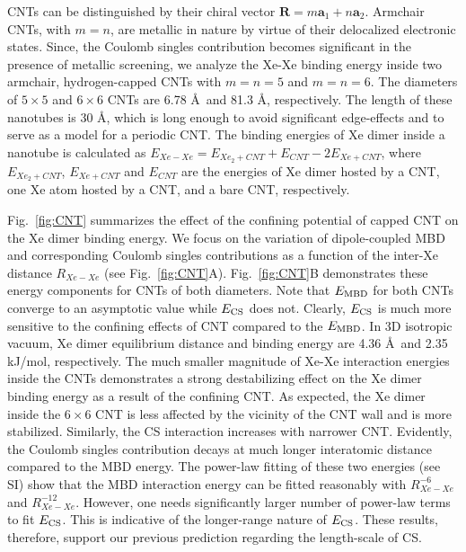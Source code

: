 \documentclass[aps,prl,groupaddress, twocolumn]{revtex4-1}  %
\begin{document}
CNTs can be distinguished by their chiral vector $\mathbf{R}=m \mathbf{a}_1 +n \mathbf{a}_2 $.
Armchair CNTs, with $m=n$, are metallic in nature by virtue of their delocalized electronic states. Since, the Coulomb singles contribution becomes significant in the presence of metallic screening\cite{sadhukhan_prl_2017}, we analyze the Xe-Xe binding energy inside two armchair, hydrogen-capped CNTs with $m = n = 5$ and $m = n = 6$. The diameters of $5\times5$ and $6\times6$ CNTs are 6.78 \AA\ and 81.3 \AA, respectively. The length of these nanotubes is 30 \AA, which is long enough to avoid significant edge-effects and to serve as a model for a periodic CNT\@. The binding energies of Xe dimer inside a nanotube is calculated as $E_{Xe-Xe} = E_{Xe_2+CNT}+E_{CNT} - 2 E_{Xe+CNT}$, where $E_{Xe_2+CNT}$, $E_{Xe+CNT}$ and $E_{CNT}$ are the energies of Xe dimer hosted by a CNT, one Xe atom hosted by a CNT, and a bare CNT, respectively.

Fig.~\ref{fig:CNT} summarizes the effect of the confining potential of capped CNT on the Xe dimer binding energy. We focus on the variation of dipole-coupled MBD and corresponding Coulomb singles contributions as a function of the inter-Xe distance $R_{Xe-Xe}$ (see Fig.~\ref{fig:CNT}A). Fig.~\ref{fig:CNT}B demonstrates these energy components for CNTs of both diameters. Note that $E_{\rm MBD}$ for both CNTs converge to an asymptotic value while $E_{\rm CS}$ does not. Clearly, $E_{\rm CS}$ is much more sensitive to the confining effects of CNT compared to the $E_{\rm MBD}$. In 3D isotropic vacuum, Xe dimer equilibrium distance and binding energy are 4.36 \AA\ and 2.35 kJ/mol, respectively\cite{Jerabek_2017}. The much smaller magnitude of Xe-Xe interaction energies inside the CNTs demonstrates a strong destabilizing effect on the Xe dimer binding energy as a result of the confining CNT\@. As expected, the Xe dimer inside the $6\times6$ CNT is less affected by the vicinity of the CNT wall and is more stabilized. Similarly, the CS interaction increases with narrower CNT\@. Evidently, the Coulomb singles contribution decays at much longer interatomic distance compared to the MBD energy. The power-law fitting of these two energies (see SI) show that the MBD interaction energy can be fitted reasonably with $R_{Xe-Xe}^{-6}$ and $R_{Xe-Xe}^{-12}$. However, one needs significantly larger number of power-law terms to fit $E_{\rm CS}$. This is indicative of the longer-range nature of $E_{\rm CS}$. These results, therefore, support our previous prediction regarding the length-scale of CS\cite{sadhukhan_prl_2017, sadhukhan_prl_reply2018}.
\end{document}
